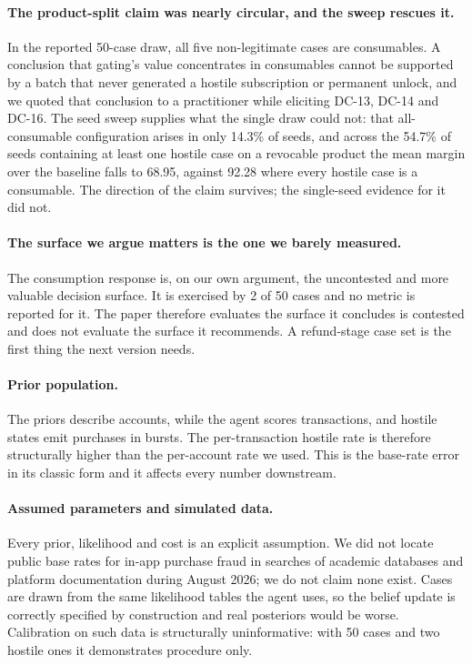 \documentclass{article}
\begin{document}
\paragraph{The product-split claim was nearly circular, and the sweep rescues it.} In the
reported 50-case draw, all five non-legitimate cases are consumables. A conclusion that
gating's value concentrates in consumables cannot be supported by a batch that never
generated a hostile subscription or permanent unlock, and we quoted that conclusion to a
practitioner while eliciting DC-13, DC-14 and DC-16. The seed sweep supplies what the
single draw could not: that all-consumable configuration arises in only 14.3\% of seeds, and
across the 54.7\% of seeds containing at least one hostile case on a revocable product the
mean margin over the baseline falls to 68.95, against 92.28 where every hostile case is a
consumable. The direction of the claim survives; the single-seed evidence for it did not.

\paragraph{The surface we argue matters is the one we barely measured.} The consumption
response is, on our own argument, the uncontested and more valuable decision surface. It is
exercised by 2 of 50 cases and no metric is reported for it. The paper therefore evaluates
the surface it concludes is contested and does not evaluate the surface it recommends. A
refund-stage case set is the first thing the next version needs.

\paragraph{Prior population.} The priors describe accounts, while the agent scores
transactions, and hostile states emit purchases in bursts. The per-transaction hostile rate
is therefore structurally higher than the per-account rate we used. This is the base-rate
error in its classic form and it affects every number downstream.

\paragraph{Assumed parameters and simulated data.} Every prior, likelihood and cost is an
explicit assumption. We did not locate public base rates for in-app purchase fraud in
searches of academic databases and platform documentation during August 2026; we do not
claim none exist. Cases are
drawn from the same likelihood tables the agent uses, so the belief update is correctly
specified by construction and real posteriors would be worse. Calibration on such data is
structurally uninformative: with 50 cases and two hostile ones it demonstrates procedure
only.
\end{document}
